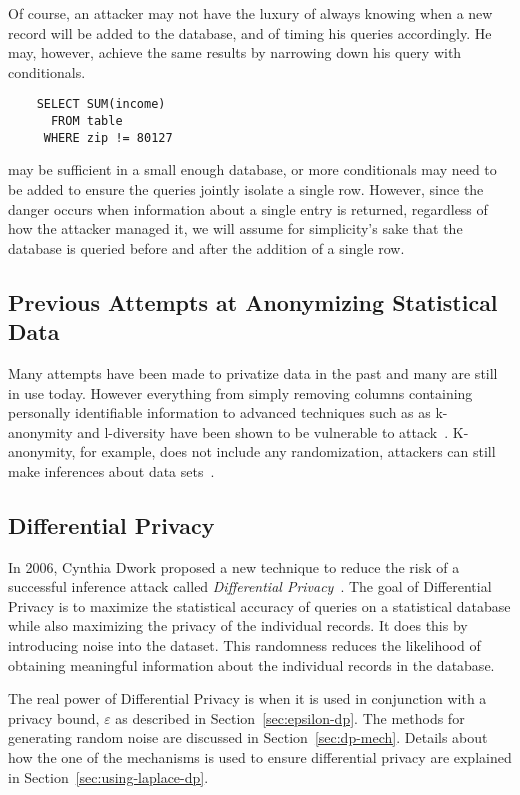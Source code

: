 \documentclass[conference,11pt]{IEEEtran}
\begin{document}
Of course, an attacker may not have the luxury of always knowing when a new
record will be added to the database, and of timing his queries accordingly. He
may, however, achieve the same results by narrowing down his query with
conditionals.

\begin{verbatim}
    SELECT SUM(income)
      FROM table
     WHERE zip != 80127
\end{verbatim}
may be sufficient in a small enough database, or more conditionals may need to
be added to ensure the queries jointly isolate a single row. However, since the
danger occurs when information about a single entry is returned, regardless of
how the attacker managed it, we will assume for simplicity's sake that the
database is queried before and after the addition of a single row.

\subsection{Previous Attempts at Anonymizing Statistical Data}
Many attempts have been made to privatize data in the past and many are still in
use today. However everything from simply removing columns containing personally
identifiable information to advanced techniques such as as k-anonymity and
l-diversity have been shown to be vulnerable to attack~\cite{Atockar:2014}.
K-anonymity, for example, does not include any randomization, attackers can
still make inferences about data sets~\cite{Aggarwal:2005}.

\subsection{Differential Privacy}
In 2006, Cynthia Dwork proposed a new technique to reduce the risk of a
successful inference attack called \textit{Differential
    Privacy}~\cite{Hilton:DP:history}. The goal of Differential Privacy is to
maximize the statistical accuracy of queries on a statistical database while
also maximizing the privacy of the individual records. It does this by
introducing noise into the dataset. This randomness reduces the likelihood of
obtaining meaningful information about the individual records in the database.

The real power of Differential Privacy is when it is used in conjunction with a
privacy bound, $\varepsilon$ as described in Section~\ref{sec:epsilon-dp}. The
methods for generating random noise are discussed in Section~\ref{sec:dp-mech}.
Details about how the one of the mechanisms is used to ensure differential
privacy are explained in Section~\ref{sec:using-laplace-dp}.
\end{document}
